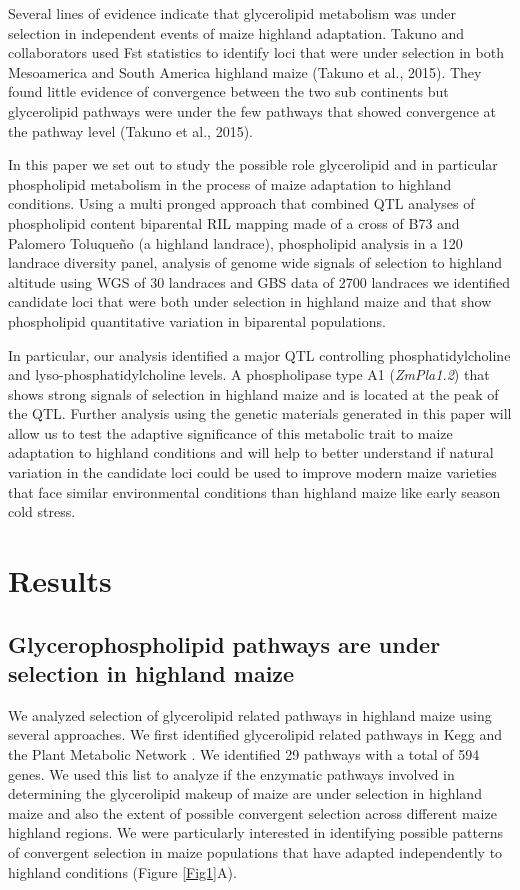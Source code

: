 \documentclass[9pt,twocolumn,twoside,lineno]{gsajnl}
\begin{document}
Several lines of evidence indicate that glycerolipid metabolism was under selection in independent events of maize highland adaptation. 
Takuno and collaborators used Fst statistics to identify loci that were under selection in both Mesoamerica and South America highland maize (Takuno et al., 2015). 
They found little evidence of convergence between the two sub continents but glycerolipid pathways were under the few pathways that showed convergence at the pathway level (Takuno et al., 2015). 

In this paper we set out to study the possible role glycerolipid and in particular phospholipid metabolism in the process of maize adaptation to highland conditions. 
Using a multi pronged approach that combined QTL analyses of phospholipid content biparental RIL mapping made of a cross of B73 and Palomero Toluqueño (a highland landrace), phospholipid analysis in a 120 landrace diversity panel, analysis of genome wide signals of selection to highland altitude using WGS of 30 landraces and GBS data of 2700 landraces we identified candidate loci  that were both under selection in highland maize and that show phospholipid quantitative variation  in biparental populations. 

In particular, our analysis identified a major QTL controlling phosphatidylcholine and lyso-phosphatidylcholine levels. A phospholipase type A1 (\textit{ZmPla1.2}) that shows strong signals of selection in highland maize and is located at the peak of the QTL. Further analysis using the genetic materials generated in this paper will allow us to test the adaptive significance of this metabolic trait to maize adaptation to highland conditions and will help to better understand if natural variation in the candidate loci could be used to improve modern maize varieties that face similar environmental conditions than highland maize like early season cold stress. 
\section{Results}
\label{sec:results}

\subsection{Glycerophospholipid pathways are under selection in  highland maize} 
We analyzed selection of glycerolipid related pathways in highland maize using several approaches. 
We first identified glycerolipid related pathways in Kegg and the Plant Metabolic Network \cite{Schlapfer2017-yl}. We identified 29 pathways with a total of 594 genes. 
We used this list to analyze if the enzymatic pathways involved in determining the glycerolipid makeup of maize are under selection in highland maize and also the extent of possible convergent selection across different maize highland regions. 
We were particularly interested in identifying possible patterns of convergent selection in maize populations that have adapted independently to highland conditions (Figure \ref{Fig1}A).  
\end{document}
